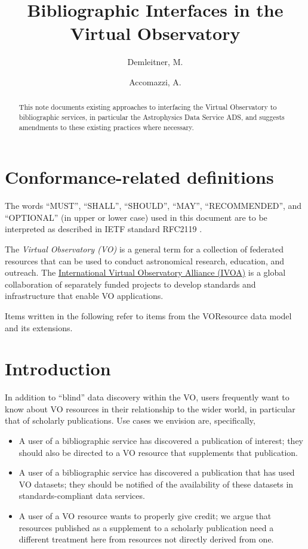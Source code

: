 \documentclass[11pt,a4paper]{ivoa}
\title{Bibliographic Interfaces in the Virtual Observatory}
\author[http://www.ivoa.net/cgi-bin/twiki/bin/view/IVOA/MarkusDemleitner]{Demleitner, M.}
\author{Accomazzi, A.}
\begin{document}
\begin{abstract}
This note documents existing approaches to interfacing the Virtual
Observatory to bibliographic services, in particular the Astrophysics
Data Service ADS, and suggests amendments to these existing practices
where necessary.
\end{abstract}


\section*{Conformance-related definitions}

The words ``MUST'', ``SHALL'', ``SHOULD'', ``MAY'', ``RECOMMENDED'', and
``OPTIONAL'' (in upper or lower case) used in this document are to be
interpreted as described in IETF standard RFC2119 \citep{std:RFC2119}.

The \emph{Virtual Observatory (VO)} is a
general term for a collection of federated resources that can be used
to conduct astronomical research, education, and outreach.
The \href{https://www.ivoa.net}{International
Virtual Observatory Alliance (IVOA)} is a global
collaboration of separately funded projects to develop standards and
infrastructure that enable VO applications.

Items written  in the following refer to items from
the VOResource data model \citet{2018ivoa.spec.0625P} and its
extensions.

\section{Introduction}

In addition to ``blind'' data discovery within the VO, users frequently
want to know about VO resources in their relationship to the wider
world, in particular that of scholarly publications.  Use cases we
envision are, specifically,

\begin{itemize}
\item A user of a bibliographic service has discovered a publication of
interest; they should also be directed to a VO resource that supplements
that publication.

\item A user of a bibliographic service has discovered a publication
that has used VO datasets; they should be notified of the availability
of these datasets in standards-compliant data services.

\item A user of a VO resource wants to properly give credit; we
argue that resources published as a supplement to a scholarly
publication need a different treatment here from resources not directly
derived from one.
\end{itemize}
\end{document}

